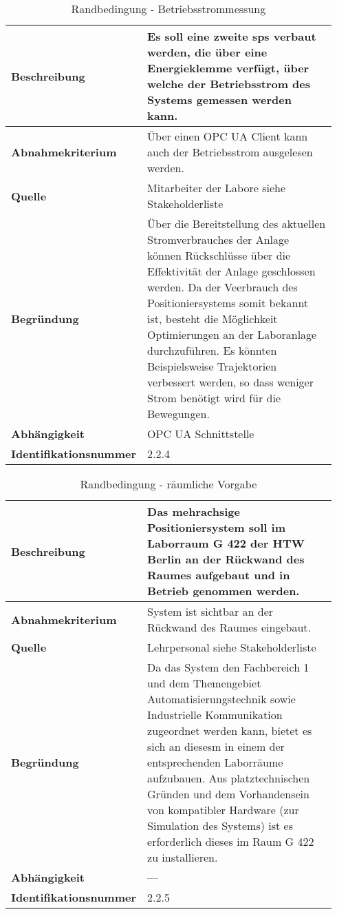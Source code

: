 \documentclass[../../../Bachelorarbeit.tex]{subfiles}
\begin{document}
\begin{table}[H]
    \centering
    \begin{tabular}{| p{0.34\linewidth} | p{0.6\linewidth} |}
        \hline
        \textbf{Beschreibung} & Es soll eine zweite \acs{sps} verbaut werden, die über eine Energieklemme verfügt, über welche der Betriebsstrom des Systems gemessen werden kann. \\ \hline
        \textbf{Abnahmekriterium} & Über einen OPC UA Client kann auch der Betriebsstrom ausgelesen werden. \\ \hline
        \textbf{Quelle} & Mitarbeiter der Labore siehe Stakeholderliste \\ \hline
        \textbf{Begründung} & Über die Bereitstellung des aktuellen Stromverbrauches der Anlage können Rückschlüsse über die Effektivität der Anlage geschlossen werden. Da der Veerbrauch des Positioniersystems somit bekannt ist, besteht die Möglichkeit Optimierungen an der Laboranlage durchzuführen. Es könnten Beispielsweise Trajektorien verbessert werden, so dass weniger Strom benötigt wird für die Bewegungen. \\ \hline
        \textbf{Abhängigkeit} & OPC UA Schnittstelle \\ \hline
        \textbf{Identifikationsnummer} & 2.2.4 \\ \hline
    \end{tabular}
    \caption[\acs{nfa} - Betriebsstrommessung]{Randbedingung - Betriebsstrommessung}
    \label{tab:my-table24}
\end{table}

\begin{table}[H]
    \centering
    \begin{tabular}{| p{0.34\linewidth} | p{0.6\linewidth} |}
        \hline
        \textbf{Beschreibung} & Das mehrachsige Positioniersystem soll im Laborraum G 422 der HTW Berlin an der Rückwand des Raumes aufgebaut und in Betrieb genommen werden. \\ \hline
        \textbf{Abnahmekriterium} & System ist sichtbar an der Rückwand des Raumes eingebaut. \\ \hline
        \textbf{Quelle} & Lehrpersonal siehe Stakeholderliste \\ \hline
        \textbf{Begründung} & Da das System den Fachbereich 1 und dem Themengebiet Automatisierungstechnik sowie Industrielle Kommunikation zugeordnet werden kann, bietet es sich an diesesm in einem der entsprechenden Laborräume aufzubauen. Aus platztechnischen Gründen und dem Vorhandensein von kompatibler Hardware (zur Simulation des Systems) ist es erforderlich dieses im Raum G 422 zu installieren. \\ \hline
        \textbf{Abhängigkeit} & -\xspace -\xspace - \\ \hline
        \textbf{Identifikationsnummer} & 2.2.5 \\ \hline
    \end{tabular}
    \caption[\acs{nfa} - räumliche Vorgabe]{Randbedingung - räumliche Vorgabe}
    \label{tab:my-table25}
\end{table}
\end{document}
